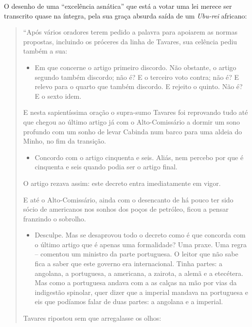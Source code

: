 \documentclass[
  letterpaper,
  DIV=11,
  numbers=noendperiod]{scrreprt}
\providecommand{\tightlist}{%
  \setlength{\itemsep}{0pt}\setlength{\parskip}{0pt}}\usepackage{longtable,booktabs,array}
\begin{document}
O desenho de uma ``excelência asnática'' que está a votar uma lei merece
ser transcrito quase na íntegra, pela sua graça absurda saída de um
\emph{Ubu-rei} africano:

\begin{quote}
``Após vários oradores terem pedido a palavra para apoiarem as normas
propostas, incluindo os próceres da linha de Tavares, sua celência pediu
também a sua:

\begin{itemize}
\tightlist
\item
  Em que concerne o artigo primeiro discordo. Não obstante, o artigo
  segundo também discordo; não é? E o terceiro voto contra; não é? E
  relevo para o quarto que também discordo. E rejeito o quinto. Não é? E
  o sexto idem.
\end{itemize}

E nesta sapientíssima oração o supra-sumo Tavares foi reprovando tudo
até que chegou ao último artigo já com o Alto-Comissário a dormir um
sono profundo com um sonho de levar Cabinda num barco para uma aldeia do
Minho, no fim da transição.

\begin{itemize}
\tightlist
\item
  Concordo com o artigo cinquenta e seis. Aliás, nem percebo por que é
  cinquenta e seis quando podia ser o artigo final.
\end{itemize}

O artigo rezava assim: este decreto entra imediatamente em vigor.

E até o Alto-Comissário, ainda com o desencanto de há pouco ter sido
sócio de americanos nos sonhos dos poços de petróleo, ficou a pensar
franzindo o sobrolho.

\begin{itemize}
\tightlist
\item
  Desculpe. Mas se desaprovou todo o decreto como é que concorda com o
  último artigo que é apenas uma formalidade? Uma praxe. Uma regra --
  comentou um ministro da parte portuguesa. O leitor que não sabe fica a
  saber que este governo era internacional. Tinha partes: a angolana, a
  portuguesa, a americana, a zairota, a alemã e a etecétera. Mas como a
  portuguesa andava com a as calças na mão por vias da indigestão
  spinolar, quer dizer que a imperial mandava na portuguesa e eis que
  podíamos falar de duas partes: a angolana e a imperial.
\end{itemize}

Tavares ripostou sem que arregalasse os olhos:


\end{quote}
\end{document}
